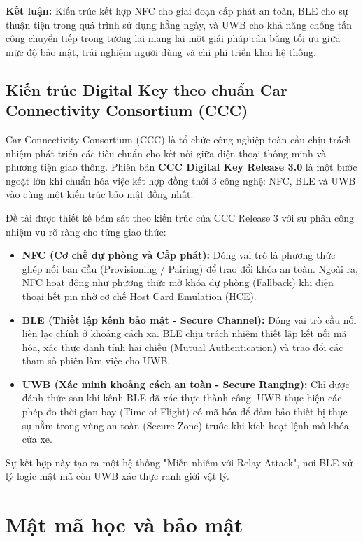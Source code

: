 \textbf{Kết luận:} Kiến trúc kết hợp NFC cho giai đoạn cấp phát an toàn, BLE cho sự thuận tiện trong quá trình sử dụng hằng ngày, và UWB cho khả năng chống tấn công chuyển tiếp trong tương lai mang lại một giải pháp cân bằng tối ưu giữa mức độ bảo mật, trải nghiệm người dùng và chi phí triển khai hệ thống.

\subsection{Kiến trúc Digital Key theo chuẩn Car Connectivity Consortium (CCC)}

Car Connectivity Consortium (CCC) là tổ chức công nghiệp toàn cầu chịu trách nhiệm phát triển các tiêu chuẩn cho kết nối giữa điện thoại thông minh và phương tiện giao thông. Phiên bản \textbf{CCC Digital Key Release 3.0} là một bước ngoặt lớn khi chuẩn hóa việc kết hợp đồng thời 3 công nghệ: NFC, BLE và UWB vào cùng một kiến trúc bảo mật đồng nhất. 

Đề tài được thiết kế bám sát theo kiến trúc của CCC Release 3 với sự phân công nhiệm vụ rõ ràng cho từng giao thức:
\begin{itemize}
    \item \textbf{NFC (Cơ chế dự phòng và Cấp phát):} Đóng vai trò là phương thức ghép nối ban đầu (Provisioning / Pairing) để trao đổi khóa an toàn. Ngoài ra, NFC hoạt động như phương thức mở khóa dự phòng (Fallback) khi điện thoại hết pin nhờ cơ chế Host Card Emulation (HCE).
    \item \textbf{BLE (Thiết lập kênh bảo mật - Secure Channel):} Đóng vai trò cầu nối liên lạc chính ở khoảng cách xa. BLE chịu trách nhiệm thiết lập kết nối mã hóa, xác thực danh tính hai chiều (Mutual Authentication) và trao đổi các tham số phiên làm việc cho UWB.
    \item \textbf{UWB (Xác minh khoảng cách an toàn - Secure Ranging):} Chỉ được đánh thức sau khi kênh BLE đã xác thực thành công. UWB thực hiện các phép đo thời gian bay (Time-of-Flight) có mã hóa để đảm bảo thiết bị thực sự nằm trong vùng an toàn (Secure Zone) trước khi kích hoạt lệnh mở khóa cửa xe.
\end{itemize}
Sự kết hợp này tạo ra một hệ thống "Miễn nhiễm với Relay Attack", nơi BLE xử lý logic mật mã còn UWB xác thực ranh giới vật lý.

\section{Mật mã học và bảo mật}

